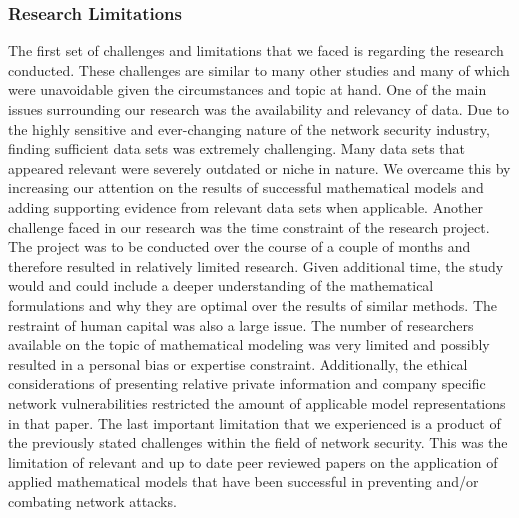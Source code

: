 \documentclass{article}
\begin{document}
\subsubsection{Research Limitations}
The first set of challenges and limitations that we faced is regarding the research conducted. These challenges are similar to many other studies and many of which were unavoidable given the circumstances and topic at hand. One of the main issues surrounding our research was the availability and relevancy of data. Due to the highly sensitive and ever-changing nature of the network security industry, finding sufficient data sets was extremely challenging. Many data sets that appeared relevant were severely outdated or niche in nature. We overcame this by increasing our attention on the results of successful mathematical models and adding supporting evidence from relevant data sets when applicable. Another challenge faced in our research was the time constraint of the research project. The project was to be conducted over the course of a couple of months and therefore resulted in relatively limited research. Given additional time, the study would and could include a deeper understanding of the mathematical formulations and why they are optimal over the results of similar methods. The restraint of human capital was also a large issue. The number of researchers available on the topic of mathematical modeling was very limited and possibly resulted in a personal bias or expertise constraint. Additionally, the ethical considerations of presenting relative private information and company specific network vulnerabilities restricted the amount of applicable model representations in that paper. The last important limitation that we experienced is a product of the previously stated challenges within the field of network security. This was the limitation of relevant and up to date peer reviewed papers on the application of applied mathematical models that have been successful in preventing and/or combating network attacks. 
\end{document}
